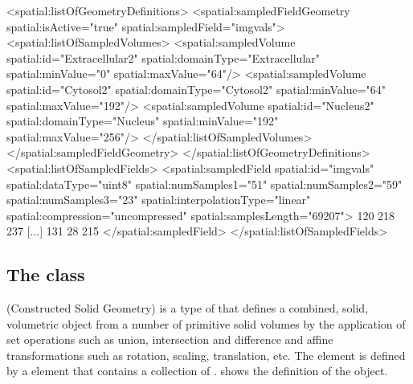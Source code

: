 \begin{example}
  <spatial:listOfGeometryDefinitions>
    <spatial:sampledFieldGeometry spatial:isActive="true" spatial:sampledField="imgvals">
      <spatial:listOfSampledVolumes>
        <spatial:sampledVolume spatial:id="Extracellular2" spatial:domainType="Extracellular"
                               spatial:minValue="0" spatial:maxValue="64"/>
        <spatial:sampledVolume spatial:id="Cytosol2" spatial:domainType="Cytosol2"
                               spatial:minValue="64" spatial:maxValue="192"/>
        <spatial:sampledVolume spatial:id="Nucleus2" spatial:domainType="Nucleus"
                               spatial:minValue="192" spatial:maxValue="256"/>
      </spatial:listOfSampledVolumes>
    </spatial:sampledFieldGeometry>
  </spatial:listOfGeometryDefinitions>
  <spatial:listOfSampledFields>
    <spatial:sampledField spatial:id="imgvals" spatial:dataType="uint8" spatial:numSamples1="51"
                          spatial:numSamples2="59" spatial:numSamples3="23"
                          spatial:interpolationType="linear" spatial:compression="uncompressed"
                          spatial:samplesLength="69207">
                                120 218 237 [...] 131 28 215
    </spatial:sampledField>
  </spatial:listOfSampledFields>
\end{example}

\subsection{The  class}
\label{csgeometry-class}
\label{listofcsgobjects-class}
\CSGeometry (Constructed Solid Geometry) is a type of \GeometryDefinition that defines a combined, solid, volumetric object from a number of primitive solid volumes by the application of set operations such as union, intersection and difference and affine transformations such as rotation, scaling, translation, etc. The \CSGeometry element is defined by a  element that contains a collection of \CSGObjects.  shows the definition of the \CSGeometry object.

